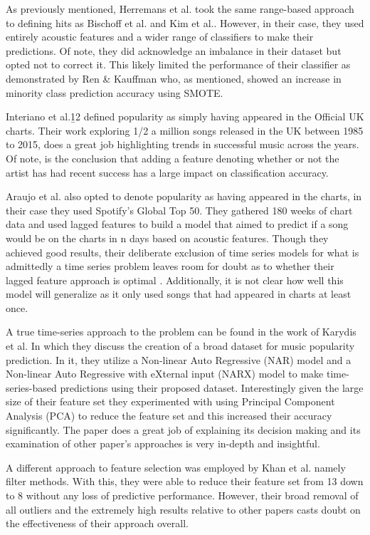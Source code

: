 \documentclass[conference]{IEEEtran}
\begin{document}
As previously mentioned, Herremans et al.\cite{b11} took the same range-based approach to defining hits as Bischoff et al.\cite{b10} and Kim et al.\cite{b9}. However, in their case, they used entirely acoustic features and a wider range of classifiers to make their predictions. Of note, they did acknowledge an imbalance in their dataset but opted not to correct it. This likely limited the performance of their classifier as demonstrated by Ren \& Kauffman\cite{b5} who, as mentioned, showed an increase in minority class prediction accuracy using SMOTE.

Interiano et al.{\b12} defined popularity as simply having appeared in the Official UK charts. Their work exploring 1/2 a million songs released in the UK between 1985 to 2015, does a great job highlighting trends in successful music across the years. Of note, is the conclusion that adding a feature denoting whether or not the artist has had recent success has a large impact on classification accuracy.

Araujo et al.\cite{b4} also opted to denote popularity as having appeared in the charts, in their case they used Spotify's Global Top 50. They gathered 180 weeks of chart data and used lagged features to build a model that aimed to predict if a song would be on the charts in n days based on acoustic features. Though they achieved good results, their deliberate exclusion of time series models for what is admittedly a time series problem leaves room for doubt as to whether their lagged feature approach is optimal . Additionally, it is not clear how well this model will generalize as it only used songs that had appeared in charts at least once.

A true time-series approach to the problem can be found in the work of Karydis et al.\cite{b13}
In which they discuss the creation of a broad dataset for music popularity prediction. In it, they utilize a Non-linear Auto Regressive (NAR) model and a Non-linear Auto Regressive with eXternal input (NARX) model to make time-series-based predictions using their proposed dataset. Interestingly given the large size of their feature set they experimented with using Principal Component Analysis (PCA) to reduce the feature set and this increased their accuracy significantly. The paper does a great job of explaining its decision making and its examination of other paper's approaches is very in-depth and insightful.

A different approach to feature selection was employed by Khan et al.\cite{b14} namely filter methods. With this, they were able to reduce their feature set from 13 down to 8 without any loss of predictive performance. However, their broad removal of all outliers and the extremely high results relative to other papers casts doubt on the effectiveness of their approach overall.
\end{document}
